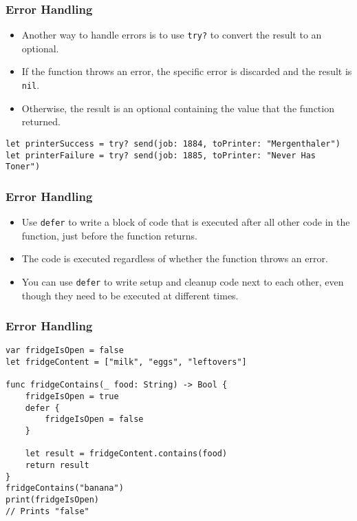 \begin{frame}[fragile] \frametitle{Error Handling}

\begin{itemize}
\item Another way to handle errors is to use \lstinline|try?| to convert the result to an optional. 
\item If the function throws an error, the specific error is discarded and the result is \lstinline|nil|. 
\item Otherwise, the result is an optional containing the value that the function returned.
\end{itemize}

\begin{lstlisting}
let printerSuccess = try? send(job: 1884, toPrinter: "Mergenthaler")
let printerFailure = try? send(job: 1885, toPrinter: "Never Has Toner")
\end{lstlisting}
\end{frame}

\begin{frame}[fragile] \frametitle{Error Handling}

\begin{itemize}
\item Use \lstinline|defer| to write a block of code that is executed after all other code in the function, just before the function returns. 
\item The code is executed regardless of whether the function throws an error. 
\item You can use \lstinline|defer| to write setup and cleanup code next to each other, even though they need to be executed at different times.
\end{itemize}

\end{frame}

\begin{frame}[fragile] \frametitle{Error Handling}

\begin{lstlisting}
var fridgeIsOpen = false
let fridgeContent = ["milk", "eggs", "leftovers"]

func fridgeContains(_ food: String) -> Bool {
    fridgeIsOpen = true
    defer {
        fridgeIsOpen = false
    }

    let result = fridgeContent.contains(food)
    return result
}
fridgeContains("banana")
print(fridgeIsOpen)
// Prints "false"
\end{lstlisting}
\end{frame}

